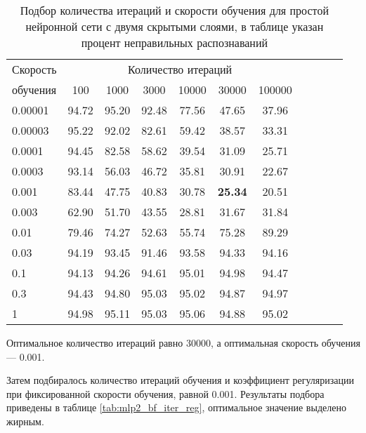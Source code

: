 \begin{table}[h]
	\centering
	\caption{Подбор количества итераций и скорости обучения для простой нейронной сети с двумя скрытыми слоями, в таблице указан процент неправильных распознаваний}
	\label{tab:mlp2_bf_iter_pace}
	\begin{tabular}{| l | c | c | c | c | c | c | c | c | c | c |}
		\hline
		Скорость & \multicolumn{6}{c|}{Количество итераций} \\
		\hhline{~----------}
		обучения \phantom{00} & \phantom{00} 100 \phantom{00} & \phantom{0} 1000 \phantom{0} & \phantom{0} 3000 \phantom{0} & \phantom{0} 10000 \phantom{0} & \phantom{0} 30000 \phantom{0} & \phantom{0} 100000 \phantom{0} \\
		\hline
		0.00001  & 94.72 & 95.20 & 92.48 & 77.56 & 47.65 & 37.96 \\
		0.00003  & 95.22 & 92.02 & 82.61 & 59.42 & 38.57 & 33.31 \\
		0.0001 	 & 94.45 & 82.58 & 58.62 & 39.54 & 31.09 & 25.71 \\
		0.0003	 & 93.14 & 56.03 & 46.72 & 35.81 & 30.91 & 22.67 \\
		0.001	 & 83.44 & 47.75 & 40.83 & 30.78 & \textbf{25.34} & 20.51 \\
		0.003	 & 62.90 & 51.70 & 43.55 & 28.81 & 31.67 & 31.84 \\
		0.01	 & 79.46 & 74.27 & 52.63 & 55.74 & 75.28 & 89.29 \\
		0.03	 & 94.19 & 93.45 & 91.46 & 93.58 & 94.33 & 94.16 \\
		0.1		 & 94.13 & 94.26 & 94.61 & 95.01 & 94.98 & 94.47 \\
		0.3		 & 94.43 & 94.80 & 95.03 & 95.02 & 94.87 & 94.97 \\
		1		 & 94.98 & 95.11 & 95.03 & 95.06 & 94.88 & 95.02 \\
		\hline
	\end{tabular}
\end{table}

Оптимальное количество итераций равно 30000, а оптимальная скорость обучения --- 0.001.

Затем подбиралось количество итераций обучения и коэффициент регуляризации при фиксированной скорости обучения, равной 0.001.
Результаты подбора приведены в таблице \ref{tab:mlp2_bf_iter_reg}, оптимальное значение выделено жирным.

